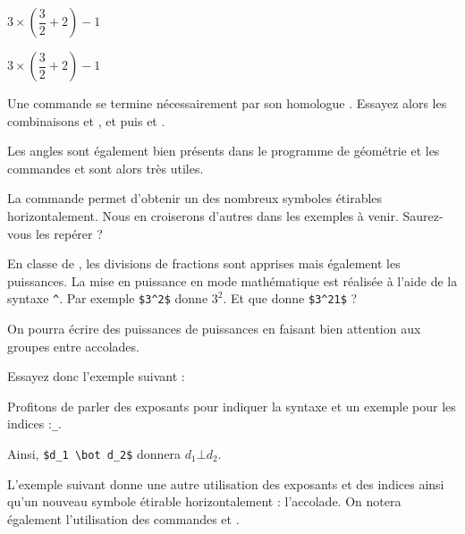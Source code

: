 \documentclass[10pt,french,openright,twoside]{book}
\begin{document}
{\NewFont
\begin{SideBySideExample}
    $3 \times (\dfrac 3 2 + 2) - 1$ \par\medskip
    $3 \times \left(\dfrac 3 2 + 2\right) - 1$
\end{SideBySideExample}
\bigskip

\begin{info}
    Une commande  se termine nécessairement par son homologue . Essayez alors les combinaisons  et , \NomCom{left[} et \NomCom{right]} puis  et .
\end{info}

Les angles sont également bien présents dans le programme de géométrie et les commandes  et  sont alors très utiles.


\begin{info}
    La commande  permet d'obtenir un des nombreux symboles étirables horizontalement. Nous en croiserons d'autres dans les exemples à venir. Saurez-vous les repérer ?
\end{info}

En classe de , les divisions de fractions sont apprises mais également les puissances. La mise en puissance en mode mathématique est réalisée à l'aide de la syntaxe \verb+^+. Par exemple \verb!$3^2$! donne $3^2$. Et que donne \verb!$3^21$! ?

\begin{info}
    On pourra écrire des puissances de puissances en faisant bien attention aux groupes entre accolades.
\end{info}

Essayez donc l'exemple suivant :


Profitons de parler des exposants pour indiquer la syntaxe et un exemple pour les indices :\linebreak {}\verb!_!.\par Ainsi, \verb!$d_1 \bot d_2$! donnera $d_1 \bot d_2$.\medskip

L'exemple suivant donne une autre utilisation des exposants et des indices ainsi qu'un nouveau symbole étirable horizontalement : l'accolade. On notera également l'utilisation des commandes  et .

}
\end{document}
